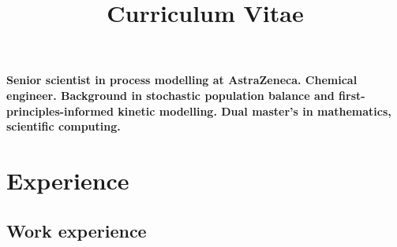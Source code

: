 \documentclass[11pt,a4paper,sans]{moderncv}   %
\title{Curriculum Vitae}
\def\addls{\vspace{2pt}}
\begin{document}
	
	\makecvtitle
	
	\small{\textbf{Senior scientist in process modelling at AstraZeneca. Chemical engineer. Background in stochastic population balance and first-principles-informed kinetic modelling. Dual master's in mathematics, scientific computing.}}
	
	\addls
	
	\section{Experience}
	
	\addls
	
	\subsection{Work experience}
	
	\addls
	
\end{document}
